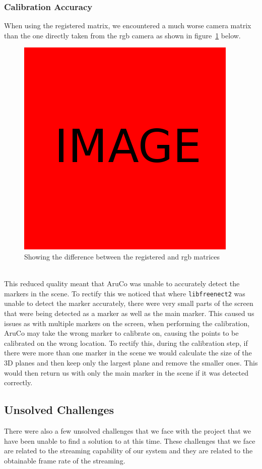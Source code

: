 \documentclass{article}
\begin{document}
\subsubsection{Calibration Accuracy}
When using the registered matrix, we encountered a much worse camera matrix than the one directly taken from the rgb camera as shown in figure~\ref{fig:registeredaccuracy} below.
\begin{figure}[h]
  \centering
  \includegraphics[scale=0.3]{placeholder}
  \caption{Showing the difference between the registered and rgb matrices}
  \label{fig:registeredaccuracy}
\end{figure}
\\
This reduced quality meant that AruCo was unable to accurately detect the markers in the scene. To rectify this we noticed that where \texttt{libfreenect2} was unable to detect the marker accurately, there were very small parts of the screen that were being detected as a marker as well as the main marker. This caused us issues as with multiple markers on the screen, when performing the calibration, AruCo may take the wrong marker to calibrate on, causing the points to be calibrated on the wrong location. To rectify this, during the calibration step, if there were more than one marker in the scene we would calculate the size of the 3D planes and then keep only the largest plane and remove the smaller ones. This would then return us with only the main marker in the scene if it was detected correctly.
\subsection{Unsolved Challenges}
There were also a few unsolved challenges that we face with the project that we have been unable to find a solution to at this time. These challenges that we face are related to the streaming capability of our system and they are related to the obtainable frame rate of the streaming.
\end{document}
